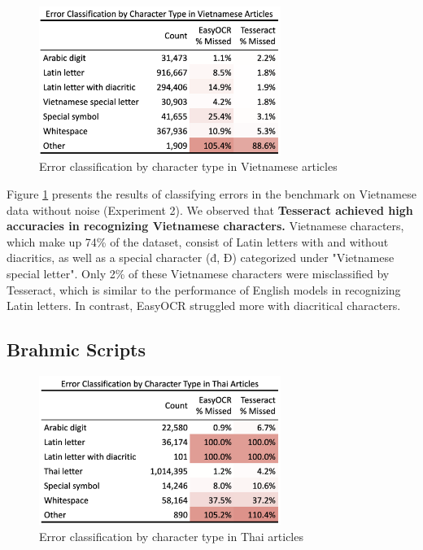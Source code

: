 \documentclass[12pt,oneside]{memoir}
\begin{document}
\begin{figure}[ht]
    \centering
    \includegraphics[width=0.7\textwidth]{images/error-classification-vietnamese.png}
    \caption{Error classification by character type in Vietnamese articles}
    \label{figure:error-classification-vietnamese}
\end{figure}

Figure \ref{figure:error-classification-vietnamese} presents the results of classifying errors in the benchmark on Vietnamese data without noise (Experiment 2). 
We observed that \textbf{Tesseract achieved high accuracies in recognizing Vietnamese characters.} 
Vietnamese characters, which make up 74\% of the dataset, consist of Latin letters with and without diacritics, as well as a special character (đ, Đ) categorized under "Vietnamese special letter".
Only 2\% of these Vietnamese characters were misclassified by Tesseract, which is similar to the performance of English models in recognizing Latin letters.
In contrast, EasyOCR struggled more with diacritical characters.

\subsection{Brahmic Scripts}

\begin{figure}[ht]
    \centering
    \includegraphics[width=0.7\textwidth]{images/error-classification-thai.png}
    \caption{Error classification by character type in Thai articles}
    \label{figure:error-classification-thai}
\end{figure}
\end{document}
